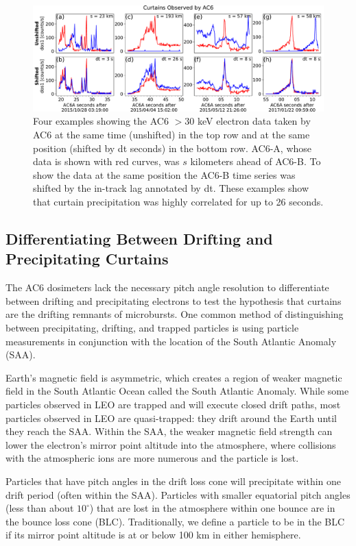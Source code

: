\documentclass[draft]{agujournal2019}
\begin{document}
\begin{figure}
\includegraphics[width=\textwidth]{fig1.pdf}
\caption{Four examples showing the AC6 $> 30$ keV electron data taken by AC6 at the same time (unshifted) in the top row and at the same position (shifted by dt seconds) in the bottom row. AC6-A, whose data is shown with red curves, was $s$ kilometers ahead of AC6-B. To show the data at the same position the AC6-B time series was shifted by the in-track lag annotated by dt. These examples show that curtain precipitation was highly correlated for up to 26 seconds.}
\label{fig1}
\end{figure}

\subsection{Differentiating Between Drifting and Precipitating Curtains}

The AC6 dosimeters lack the necessary pitch angle resolution to differentiate between drifting and precipitating electrons to test the  hypothesis that curtains are the drifting remnants of microbursts. One common method of distinguishing between precipitating, drifting, and trapped particles is using particle measurements in conjunction with the location of the South Atlantic Anomaly (SAA).

Earth's magnetic field is asymmetric, which creates a region of weaker magnetic field in the South Atlantic Ocean called the South Atlantic Anomaly. 
While some particles observed in LEO are trapped and will execute closed drift paths, most particles observed in LEO are quasi-trapped: they drift around the Earth until they reach the SAA. Within the SAA, the weaker magnetic field strength can lower the electron's mirror point altitude into the atmosphere, where collisions with the atmospheric ions are more numerous and the particle is lost. 

Particles that have pitch angles in the drift loss cone will precipitate within one drift period (often within the SAA). Particles with smaller equatorial pitch angles (less than about $10^\circ$) that are lost in the atmosphere within one bounce are in the bounce loss cone (BLC). Traditionally, we define a particle to be in the BLC if its mirror point altitude is at or below 100 km in either hemisphere.
\end{document}
